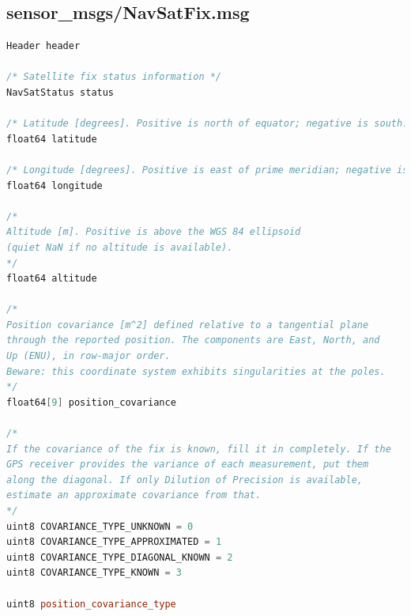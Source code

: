 \documentclass[titlepage,12pt,a4paper]{article}
\begin{document}
\subsection{sensor\_msgs/NavSatFix.msg}
\begin{lstlisting}[language=C++]
Header header

/* Satellite fix status information */
NavSatStatus status

/* Latitude [degrees]. Positive is north of equator; negative is south. */
float64 latitude

/* Longitude [degrees]. Positive is east of prime meridian; negative is west. */
float64 longitude

/*
Altitude [m]. Positive is above the WGS 84 ellipsoid
(quiet NaN if no altitude is available).
*/
float64 altitude

/*
Position covariance [m^2] defined relative to a tangential plane
through the reported position. The components are East, North, and
Up (ENU), in row-major order.
Beware: this coordinate system exhibits singularities at the poles.
*/
float64[9] position_covariance

/*
If the covariance of the fix is known, fill it in completely. If the
GPS receiver provides the variance of each measurement, put them
along the diagonal. If only Dilution of Precision is available,
estimate an approximate covariance from that.
*/
uint8 COVARIANCE_TYPE_UNKNOWN = 0
uint8 COVARIANCE_TYPE_APPROXIMATED = 1
uint8 COVARIANCE_TYPE_DIAGONAL_KNOWN = 2
uint8 COVARIANCE_TYPE_KNOWN = 3

uint8 position_covariance_type
\end{lstlisting}
\end{document}
